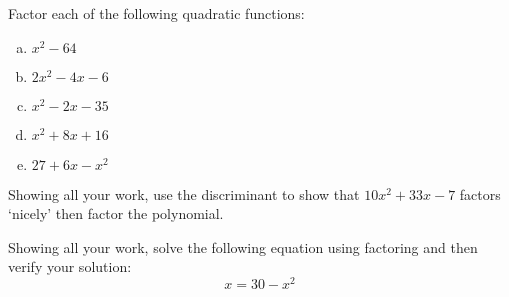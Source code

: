 \documentclass[11pt,letterpaper]{article}
\begin{document}

 Factor each of the following quadratic functions:
	\begin{enumerate}[(a)]
	\item $x^2 - 64$
	\item $2x^2 - 4x - 6$
	\item $x^2 - 2x - 35$
	\item $x^2 + 8x + 16$
	\item $27 + 6x - x^2$
	\end{enumerate}



\newpage



 Showing all your work, use the discriminant to show that  $10x^2 + 33x - 7$ factors `nicely' then factor the polynomial. 



\newpage



 Showing all your work, solve the following equation using factoring and then verify your solution:
	\[
	x= 30 - x^2
	\]
\end{document}
